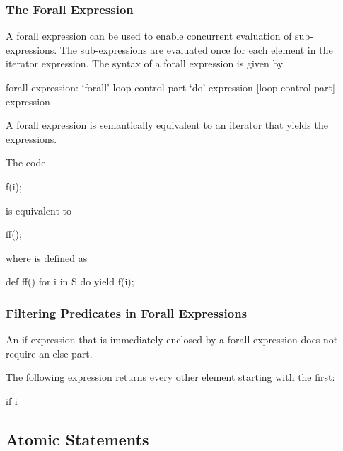 \subsubsection{The Forall Expression}
\label{Forall_Expressions}

A forall expression can be used to enable concurrent evaluation of
sub-expressions.  The sub-expressions are evaluated once for each
element in the iterator expression.  The syntax of a forall expression
is given by
\begin{syntax}
forall-expression:
  `forall' loop-control-part `do' expression
  [loop-control-part] expression
\end{syntax}

A forall expression is semantically equivalent to an iterator that
yields the expressions.

\begin{example}
The code
\begin{chapel}
[i in S] f(i);
\end{chapel}
is equivalent to
\begin{chapel}
ff();
\end{chapel}
where  is defined as
\begin{chapel}
def ff() {
  for i in S do
    yield f(i);
}
\end{chapel}
\end{example}

\subsubsection{Filtering Predicates in Forall Expressions}
\label{Filtering_Predicates_Forall}

An if expression that is immediately enclosed by a forall expression
does not require an else part.
\begin{example}
The following expression returns every other element starting with the
first:
\begin{chapel}
[i in 1..s.length] if i %
\end{chapel}
\end{example}

\subsection{Atomic Statements}
\label{Atomic_Transactions}
\label{atomicity}

